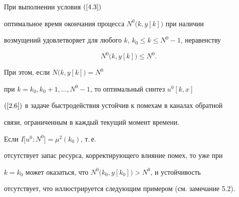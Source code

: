 \begin{assrts}


При выполнении условия $(\ref{4.3})$


оптимальное время окончания процесса $N^0\bigl(k, y[k]\bigr)$ при наличии


возмущений удовлетворяет для любого $k$, $k_0\le k\le N^0-1$, неравенству


$$


N^0\bigl(k, y[k]\bigr)\le N^0.


$$


При этом, если $N\bigl(k, y[k]\bigr)=N^0$


при $k=k_0, k_0+1,\dotsc, N^0-1$, то оптимальный синтез $u^0[k, x]$


$(\ref{2.6})$ в задаче быстродействия устойчив к помехам в каналах обратной


связи, ограниченным в каждый текущий момент времени.


\end{assrts}





\begin{notes}


Если $I\bigl[u^0; N^0\bigr]=\mu^2(k_0)$, т.\,е. 


отсутствует запас ресурса, корректирующего влияние помех, то уже при


$k=k_0$ может оказаться, что $N^0\bigl(k_0, y[k_0]\bigr)>N^0$, и устойчивость


отсутствует, что иллюстрируется следующим примером (см. замечание 5.2).


\end{notes}








